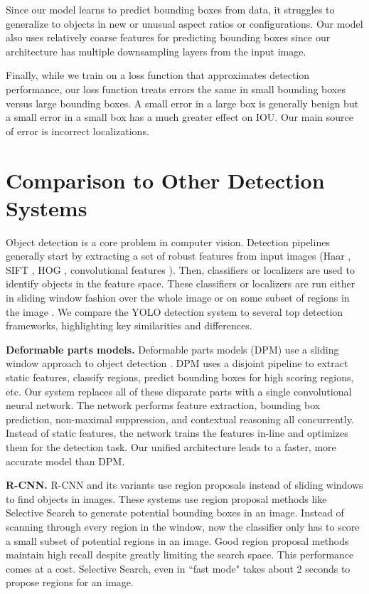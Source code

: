 \documentclass{article} %
\begin{document}
Since our model learns to predict bounding boxes from data, it struggles to generalize to objects in new or unusual aspect ratios or configurations. Our model also uses relatively coarse features for predicting bounding boxes since our architecture has multiple downsampling layers from the input image.

Finally, while we train on a loss function that approximates detection performance, our loss function treats errors the same in small bounding boxes versus large bounding boxes. A small error in a large box is generally benign but a small error in a small box has a much greater effect on IOU. Our main source of error is incorrect localizations.


\section{Comparison to Other Detection Systems}

Object detection is a core problem in computer vision. Detection pipelines generally start by extracting a set of robust features from input images (Haar \cite{papageorgiou1998general}, SIFT \cite{lowe1999object}, HOG \cite{dalal2005histograms}, convolutional features \cite{donahue2013decaf}). Then, classifiers \cite{viola2001robust,lienhart2002extended,girshick2014rich,lsvm-pami} or localizers \cite{blaschko2008learning,DBLP:journals/corr/SermanetEZMFL13} are used to identify objects in the feature space. These classifiers or localizers are run either in sliding window fashion over the whole image or on some subset of regions in the image \cite{uijlings2013selective,gould2009region,zitnick2014edge}. We compare the YOLO detection system to several top detection frameworks, highlighting key similarities and differences.

\textbf{Deformable parts models.} Deformable parts models (DPM) use a sliding window approach to object detection \cite{lsvm-pami}. DPM uses a disjoint pipeline to extract static features, classify regions, predict bounding boxes for high scoring regions, etc. Our system replaces all of these disparate parts with a single convolutional neural network. The network performs feature extraction, bounding box prediction, non-maximal suppression, and contextual reasoning all concurrently. Instead of static features, the network trains the features in-line and optimizes them for the detection task. Our unified architecture leads to a faster, more accurate model than DPM.

\textbf{R-CNN.} R-CNN and its variants use region proposals instead of sliding windows to find objects in images. These systems use region proposal methods like Selective Search \cite{uijlings2013selective} to generate potential bounding boxes in an image. Instead of scanning through every region in the window, now the classifier only has to score a small subset of potential regions in an image. Good region proposal methods maintain high recall despite greatly limiting the search space. This performance comes at a cost. Selective Search, even in ``fast mode" takes about 2 seconds to propose regions for an image.
\end{document}
